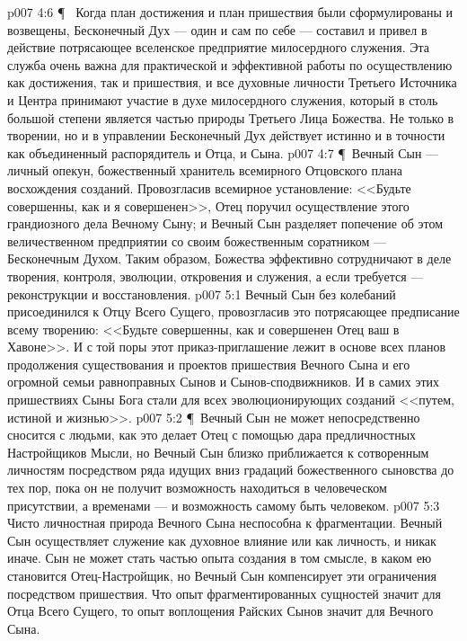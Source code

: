\vs p007 4:6 \P\ \bibnobreakspace {} Когда план достижения и план пришествия были сформулированы и возвещены, Бесконечный Дух --- один и сам по себе --- составил и привел в действие потрясающее вселенское предприятие милосердного служения. Эта служба очень важна для практической и эффективной работы по осуществлению как достижения, так и пришествия, и все духовные личности Третьего Источника и Центра принимают участие в духе милосердного служения, который в столь большой степени является частью природы Третьего Лица Божества. Не только в творении, но и в управлении Бесконечный Дух действует истинно и в точности как объединенный распорядитель и Отца, и Сына.
\vs p007 4:7 \P\ Вечный Сын --- личный опекун, божественный хранитель всемирного Отцовского плана восхождения созданий. Провозгласив всемирное установление: <<Будьте совершенны, как и я совершенен>>, Отец поручил осуществление этого грандиозного дела Вечному Сыну; и Вечный Сын разделяет попечение об этом величественном предприятии со своим божественным соратником --- Бесконечным Духом. Таким образом, Божества эффективно сотрудничают в деле творения, контроля, эволюции, откровения и служения, а если требуется --- реконструкции и восстановления.
\vs p007 5:1 Вечный Сын без колебаний присоединился к Отцу Всего Сущего, провозгласив это потрясающее предписание всему творению: <<Будьте совершенны, как и совершенен Отец ваш в Хавоне>>. И с той поры этот приказ\hyp{}приглашение лежит в основе всех планов продолжения существования и проектов пришествия Вечного Сына и его огромной семьи равноправных Сынов и Сынов\hyp{}сподвижников. И в самих этих пришествиях Сыны Бога стали для всех эволюционирующих созданий <<путем, истиной и жизнью>>.
\vs p007 5:2 \P\ Вечный Сын не может непосредственно сносится с людьми, как это делает Отец с помощью дара предличностных Настройщиков Мысли, но Вечный Сын близко приближается к сотворенным личностям посредством ряда идущих вниз градаций божественного сыновства до тех пор, пока он не получит возможность находиться в человеческом присутствии, а временами --- и возможность самому быть человеком.
\vs p007 5:3 Чисто личностная природа Вечного Сына неспособна к фрагментации. Вечный Сын осуществляет служение как духовное влияние или как личность, и никак иначе. Сын не может стать частью опыта создания в том смысле, в каком ею становится Отец\hyp{}Настройщик, но Вечный Сын компенсирует эти ограничения посредством пришествия. Что опыт фрагментированных сущностей значит для Отца Всего Сущего, то опыт воплощения Райских Сынов значит для Вечного Сына.
